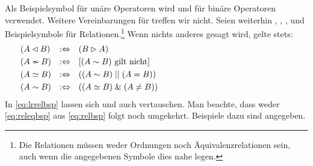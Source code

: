 Als Beispielsymbol für unäre Operatoren wird \symqt{\opubsp} und für binäre Operatoren \symqt{\opbsp} verwendet.
Weitere Vereinbarungen für \symqt{\opubsp} treffen wir nicht.
Seien weiterhin , , ,  und  Beispielsymbole für Relationen.\footnote{%
	Die Relationen müssen weder Ordnungen noch Äquivalenzrelationen sein, auch wenn die angegebenen Symbole dies nahe legen.%
}
Wenn nichts anderes gesagt wird, gelte stets:
%
\begin{align}
	& (A \lhd   B) & :\Leftrightarrow & \quad  (B \rhd   A)
	\label{eq:lrrelbsp}   \\
	& (A \nsim  B)  & :\Leftrightarrow & \quad [(A \sim   B) \text{ gilt nicht}]
	\label{eq:relnbsp}    \\
	& (A \simeq  B) & :\Leftrightarrow & \quad ((A \sim   B) \;||\;  (A = B))
	\label{eq:releqbsp}   \\
	& (A \sim B)    & :\Leftrightarrow & \quad ((A \simeq B) \;\&\; (A \ne B))
	\label{eq:relbsp}    &&&&&&&&&&&&&&&&&&&&&&&&&&&&&&
\end{align}
%
In \eqref{eq:lrrelbsp} lassen sich \symqt{\lrelbsp} und \symqt{\rrelbsp} auch vertauschen.
Man beachte, dass weder \eqref{eq:releqbsp} aus \eqref{eq:relbsp} folgt noch umgekehrt.
Beispiele dazu sind  angegeben.

